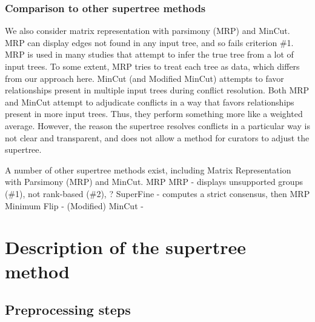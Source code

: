 \documentclass[fleqn,12pt,lineno,english]{wlpeerj}
\begin{document}
\subsubsection{Comparison to other supertree methods}

We also consider matrix representation with parsimony (MRP) and MinCut.
MRP can display edges not found
in any input tree, and so fails criterion \#1.  MRP is used in many
studies that attempt to infer the true tree from a lot of input
trees.  To some extent, MRP tries to treat each tree as data, which
differs from our approach here.
MinCut (and Modified MinCut) attempts to favor relationships present
in multiple input trees during conflict resolution.
Both MRP and MinCut attempt to adjudicate conflicts in a way that
favors relationships present in more input trees.  Thus, they perform
something more like a weighted average.  However, the reason the
supertree resolves conflicts in a particular way is not clear and
transparent, and does not allow a method for curators to adjust the
supertree.

A number of other supertree methods exist, including Matrix
Representation with Parsimony (MRP) and MinCut.  MRP
MRP - displays unsupported groups (\#1), not rank-based (\#2), ?
SuperFine - computes a strict consensus, then MRP
Minimum Flip - 
(Modified) MinCut - 

\section{Description of the supertree method}

\subsection{Preprocessing steps}
\end{document}
